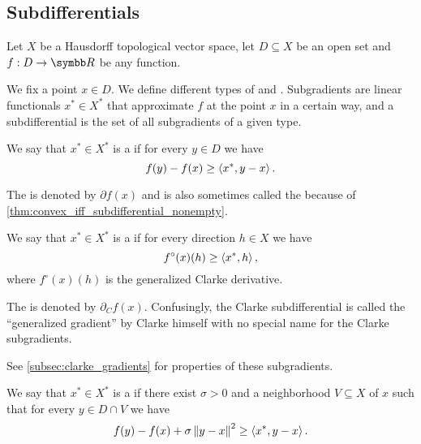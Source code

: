 \subsection{Subdifferentials}\label{subsec:subdifferentials}

Let \( X \) be a Hausdorff topological vector space, let \( D \subseteq X \) be an open set and \( f: D \to \BR \) be any function.

\begin{definition}\label{def:subdifferentials}
  We fix a point \( x \in D \). We define different types of  and . Subgradients are linear functionals \( x^* \in X^* \) that approximate \( f \) at the point \( x \) in a certain way, and a subdifferential is the set of all subgradients of a given type.

  \begin{defenum}
    \cite[59]{Clarke2013} We say that \( x^* \in X^* \) is a  if for every \( y \in D \) we have
    \begin{equation*}
      f(y) - f(x) \geq \left\langle x^*, y - x \right\rangle.
    \end{equation*}

    The  is denoted by \( \partial f(x) \) and is also sometimes called the  because of \cref{thm:convex_iff_subdifferential_nonempty}.

    \cite[definition 10.3]{Clarke2013} We say that \( x^* \in X^* \) is a  if for every direction \( h \in X \) we have
    \begin{equation*}
      f^\circ(x)(h) \geq \left\langle x^*, h \right\rangle,
    \end{equation*}
    where \( f^\circ(x)(h) \) is the generalized Clarke derivative.

    The  is denoted by \( \partial_C f(x) \). Confusingly, the Clarke subdifferential is called the \enquote{generalized gradient} by Clarke himself with no special name for the Clarke subgradients.

    See \cref{subsec:clarke_gradients} for properties of these subgradients.

    \cite[227]{Clarke2013} We say that \( x^* \in X^* \) is a  if there exist \( \sigma > 0 \) and a neighborhood \( V \subseteq X \) of \( x \) such that for every \( y \in D \cap V \) we have
    \begin{equation*}
      f(y) - f(x) + \sigma \left\Vert y - x \right\Vert^2 \geq \left\langle x^*, y - x \right\rangle.
    \end{equation*}


\end{defenum}
\end{definition}
